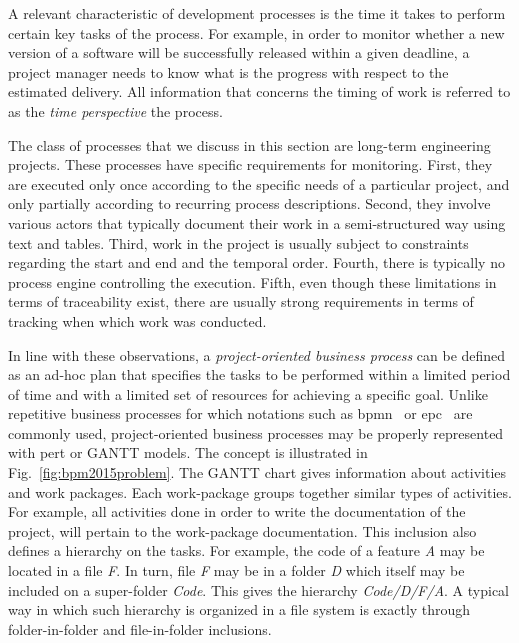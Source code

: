 A relevant characteristic of development processes is the time it takes to perform certain key tasks of the process. For example, in order to monitor whether a new version of a software will be successfully released within a given deadline, a project manager needs to know what is the progress with respect to the estimated delivery. All information that concerns the timing of work is referred to as the \emph{time perspective} the process. 

The class of processes that we discuss in this section are long-term engineering projects. These processes have specific requirements for monitoring. First, they are executed only once according to the specific needs of a particular project, and only partially according to recurring process descriptions. Second, they involve various actors that typically document their work in a semi-structured way using text and tables. Third, work in the project is usually subject to constraints regarding the start and end and the temporal order. Fourth, there is typically no process engine controlling the execution. Fifth, even though these limitations in terms of traceability exist, there are usually strong requirements in terms of tracking when which work was conducted.


In line with these observations, a \textit{project-oriented business process} can be defined as an ad-hoc plan that specifies the tasks to be performed within a limited period of time and with a limited set of resources for achieving a specific goal. Unlike repetitive business processes for which notations such as \gls{bpmn}~\citep{bpmn2_stable} or \gls{epc}~\citep{vanderaalst_formalization_1999} are commonly used, project-oriented business processes may be properly represented with \gls{pert} or GANTT models. The concept is illustrated in Fig.~\ref{fig:bpm2015problem}.
The GANTT chart gives information about activities and work packages. Each work-package groups together similar types of activities. For example, all activities done in order to write the documentation of the project, will pertain to the work-package documentation. This inclusion also defines a hierarchy on the tasks. For example, the code of a feature \emph{A} may be located in a file \emph{F}. In turn, file \emph{F} may be in a folder \emph{D} which itself may be included on a super-folder \emph{Code}. This gives the hierarchy \emph{Code/D/F/A}. A typical way in which such hierarchy is organized in a file system is exactly through folder-in-folder and file-in-folder inclusions. 

